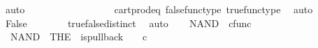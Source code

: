 \begin{isabellebody}
\ auto\isanewline
\ \ \ \ \isamarkupfalse%
\ \isamarkupfalse%
\ {\isachardoublequoteopen}{\isasymt}\ {\isacharequal}{\kern0pt}\ {\isasymf}{\isachardoublequoteclose}\isanewline
\ \ \ \ \ \ \isamarkupfalse%
\ cart{\isacharunderscore}{\kern0pt}prod{\isacharunderscore}{\kern0pt}eq{}\ false{\isacharunderscore}{\kern0pt}func{\isacharunderscore}{\kern0pt}type\ true{\isacharunderscore}{\kern0pt}func{\isacharunderscore}{\kern0pt}type\ \isamarkupfalse%
\ auto\isanewline
\ \ \ \ \isamarkupfalse%
\ \isamarkupfalse%
\ False\isanewline
\ \ \ \ \ \ \isamarkupfalse%
\ true{\isacharunderscore}{\kern0pt}false{\isacharunderscore}{\kern0pt}distinct\ \isamarkupfalse%
\ auto\isanewline
\ \ \isamarkupfalse%
\isanewline
{}\isamarkupfalse%
%
\endisatagproof
{\isafoldproof}%
%
\isadelimproof
%
\endisadelimproof
%
\isadelimdocument
%
\endisadelimdocument
%
\isatagdocument
%
\isamarkuptrue%
%
\endisatagdocument
{\isafolddocument}%
%
\isadelimdocument
%
\endisadelimdocument
{}\isamarkupfalse%
\ NAND\ {\isacharcolon}{\kern0pt}{\isacharcolon}{\kern0pt}\ {\isachardoublequoteopen}cfunc{\isachardoublequoteclose}\ \isanewline
\ \ {\isachardoublequoteopen}NAND\ {\isacharequal}{\kern0pt}\ {\isacharparenleft}{\kern0pt}THE\ {\isasymchi}{\isachardot}{\kern0pt}\ is{\isacharunderscore}{\kern0pt}pullback\ {\isacharparenleft}{\kern0pt}{\isasymone}{\isasymCoprod}{\isacharparenleft}{\kern0pt}{\isasymone}{\isasymCoprod}{\isasymone}{\isacharparenright}{\kern0pt}{\isacharparenright}{\kern0pt}\ {\isasymone}\ {\isacharparenleft}{\kern0pt}{\isasymOmega}\ {\isasymtimes}\isactrlsub c\ {\isasymOmega}{\isacharparenright}{\kern0pt}\ {\isasymOmega}\ {\isacharparenleft}{\kern0pt}{\isasymbeta}\isactrlbsub {\isacharparenleft}{\kern0pt}{\isasymone}{\isasymCoprod}{\isacharparenleft}{\kern0pt}{\isasymone}{\isasymCoprod}{\isasymone}{\isacharparenright}{\kern0pt}{\isacharparenright}{\kern0pt}\isactrlesub {\isacharparenright}{\kern0pt}\ {\isasymt}\ {\isacharparenleft}{\kern0pt}{\isasymlangle}{\isasymf}{\isacharcomma}{\kern0pt}\ {\isasymf}{\isasymrangle}{\isasymamalg}\ {\isacharparenleft}{\kern0pt}{\isasymlangle}{\isasymt}{\isacharcomma}{\kern0pt}\ {\isasymf}{\isasymrangle}\ {\isasymamalg}{\isasymlangle}{\isasymf}{\isacharcomma}{\kern0pt}\ {\isasymt}{\isasymrangle}{\isacharparenright}{\kern0pt}{\isacharparenright}{\kern0pt}\ {\isasymchi}{\isacharparenright}{\kern0pt}{\isachardoublequoteclose}\isanewline

\end{isabellebody}
